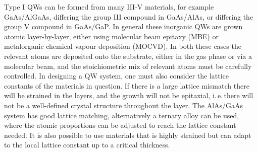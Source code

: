 Type I QWs can be formed from many III-V materials, for example GaAs/AlGaAs, differing the group III compound in GaAs/AlAs, or differing the group V compound in GaAs/GaP. In general these inorganic QWs are grown atomic layer-by-layer, either using molecular beam epitaxy (MBE) or metalorganic chemical vapour deposition (MOCVD). In both these cases the relevant atoms are deposited onto the substrate, either in the gas phase or via a molecular beam, and the stoichiometric mix of relevant atoms must be carefully controlled. In designing a QW system, one must also consider the lattice constants of the materials in question. If there is a large lattice mismatch there will be strained in the layers, and the growth will not be epitaxial, i.\,e.\,there will not be a well-defined crystal structure throughout the layer. The AlAs/GaAs system has good lattice matching, alternatively a ternary alloy can be used, where the atomic proportions can be adjusted to reach the lattice constant needed. It is also possible to use materials that is highly strained but can adapt to the local lattice constant up to a critical thickness.


